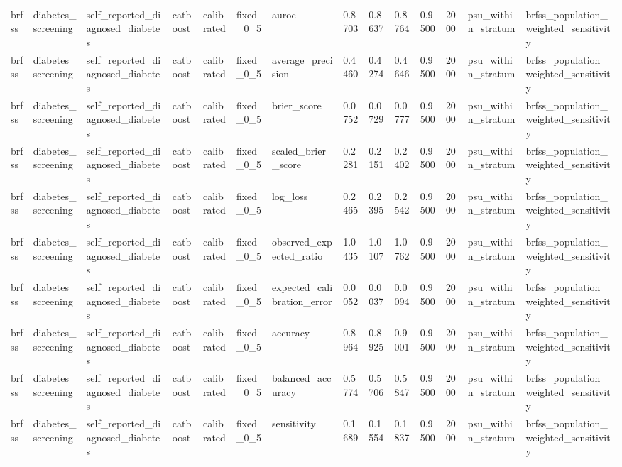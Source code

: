 \begin{tabular}{llllllllllllll}
brfss & diabetes\_screening & self\_reported\_diagnosed\_diabetes & catboost & calibrated & fixed\_0\_5 & auroc & 0.8703 & 0.8637 & 0.8764 & 0.9500 & 2000 & psu\_within\_stratum & brfss\_population\_weighted\_sensitivity \\
brfss & diabetes\_screening & self\_reported\_diagnosed\_diabetes & catboost & calibrated & fixed\_0\_5 & average\_precision & 0.4460 & 0.4274 & 0.4646 & 0.9500 & 2000 & psu\_within\_stratum & brfss\_population\_weighted\_sensitivity \\
brfss & diabetes\_screening & self\_reported\_diagnosed\_diabetes & catboost & calibrated & fixed\_0\_5 & brier\_score & 0.0752 & 0.0729 & 0.0777 & 0.9500 & 2000 & psu\_within\_stratum & brfss\_population\_weighted\_sensitivity \\
brfss & diabetes\_screening & self\_reported\_diagnosed\_diabetes & catboost & calibrated & fixed\_0\_5 & scaled\_brier\_score & 0.2281 & 0.2151 & 0.2402 & 0.9500 & 2000 & psu\_within\_stratum & brfss\_population\_weighted\_sensitivity \\
brfss & diabetes\_screening & self\_reported\_diagnosed\_diabetes & catboost & calibrated & fixed\_0\_5 & log\_loss & 0.2465 & 0.2395 & 0.2542 & 0.9500 & 2000 & psu\_within\_stratum & brfss\_population\_weighted\_sensitivity \\
brfss & diabetes\_screening & self\_reported\_diagnosed\_diabetes & catboost & calibrated & fixed\_0\_5 & observed\_expected\_ratio & 1.0435 & 1.0107 & 1.0762 & 0.9500 & 2000 & psu\_within\_stratum & brfss\_population\_weighted\_sensitivity \\
brfss & diabetes\_screening & self\_reported\_diagnosed\_diabetes & catboost & calibrated & fixed\_0\_5 & expected\_calibration\_error & 0.0052 & 0.0037 & 0.0094 & 0.9500 & 2000 & psu\_within\_stratum & brfss\_population\_weighted\_sensitivity \\
brfss & diabetes\_screening & self\_reported\_diagnosed\_diabetes & catboost & calibrated & fixed\_0\_5 & accuracy & 0.8964 & 0.8925 & 0.9001 & 0.9500 & 2000 & psu\_within\_stratum & brfss\_population\_weighted\_sensitivity \\
brfss & diabetes\_screening & self\_reported\_diagnosed\_diabetes & catboost & calibrated & fixed\_0\_5 & balanced\_accuracy & 0.5774 & 0.5706 & 0.5847 & 0.9500 & 2000 & psu\_within\_stratum & brfss\_population\_weighted\_sensitivity \\
brfss & diabetes\_screening & self\_reported\_diagnosed\_diabetes & catboost & calibrated & fixed\_0\_5 & sensitivity & 0.1689 & 0.1554 & 0.1837 & 0.9500 & 2000 & psu\_within\_stratum & brfss\_population\_weighted\_sensitivity \\

\end{tabular}
